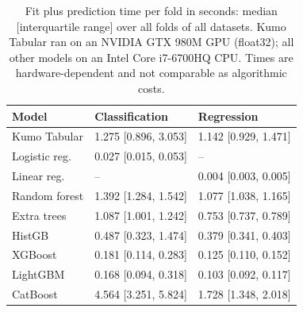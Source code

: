 \begin{table}[t]
\centering
\small
\caption{Fit plus prediction time per fold in seconds: median [interquartile range] over all folds of all datasets. Kumo Tabular ran on an NVIDIA GTX 980M GPU (float32); all other models on an Intel Core i7-6700HQ CPU. Times are hardware-dependent and not comparable as algorithmic costs.}
\label{tab:runtime}
\begin{tabular}{lll}
\toprule
Model & Classification & Regression \\
\midrule
Kumo Tabular & 1.275 [0.896, 3.053] & 1.142 [0.929, 1.471] \\
Logistic reg. & 0.027 [0.015, 0.053] & -- \\
Linear reg. & -- & 0.004 [0.003, 0.005] \\
Random forest & 1.392 [1.284, 1.542] & 1.077 [1.038, 1.165] \\
Extra trees & 1.087 [1.001, 1.242] & 0.753 [0.737, 0.789] \\
HistGB & 0.487 [0.323, 1.474] & 0.379 [0.341, 0.403] \\
XGBoost & 0.181 [0.114, 0.283] & 0.125 [0.110, 0.152] \\
LightGBM & 0.168 [0.094, 0.318] & 0.103 [0.092, 0.117] \\
CatBoost & 4.564 [3.251, 5.824] & 1.728 [1.348, 2.018] \\
\bottomrule
\end{tabular}
\end{table}
